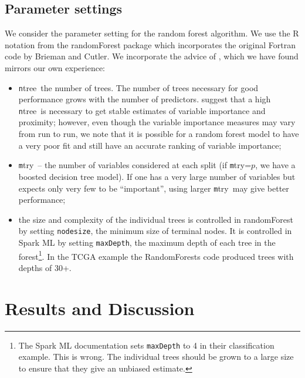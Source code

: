 \documentclass[10pt,letterpaper]{article}
\newcommand{\mtry}{{\texttt mtry}}
\newcommand{\ntree}{{\texttt ntree}}
\begin{document}
\subsection{Parameter settings}
We consider the parameter setting for the random forest algorithm. We use the R notation from the {\sc randomForest} package
\cite{Liaw.and.Weiner.2002} which incorporates the original Fortran code by Brieman and Cutler.  We incorporate the
advice of \cite{Liaw.and.Weiner.2002}, which we have found mirrors our own experience:
\begin{itemize}
\item \ntree\ the number of trees.  The number of trees necessary for good performance grows with the number of
  predictors.  \cite{Liaw.and.Weiner.2002} suggest that a high \ntree\ is necessary to get stable estimates of variable
  importance and proximity; however, even though the variable importance measures may vary from run to run, we note that
  it is possible for a random forest model to have a very poor fit and still have an accurate ranking of variable
  importance;
\item \mtry\ -- the number of variables considered at each split (if \mtry=$p$, we have a boosted decision
  tree model).  If one has a very large number of variables but expects only very few to be ``important'', using larger \mtry\ may give
  better performance;
\item the size and complexity of the individual trees is controlled in {\sc randomForest} by setting \texttt{nodesize}, the
  minimum size of terminal nodes. It is controlled in Spark ML by setting \texttt{maxDepth}, the maximum depth of each
  tree in the forest\footnote{The Spark ML documentation \cite[]{Spark.2016} sets \texttt{maxDepth}
    to 4 in their classification example. This is wrong. The
    individual trees should be grown to a large size to ensure that
    they give an unbiased estimate.}.
  In the TCGA example the RandomForests code produced trees with depths of 30+. 
\end{itemize}


%
%
\section{Results and Discussion}



\end{document}
